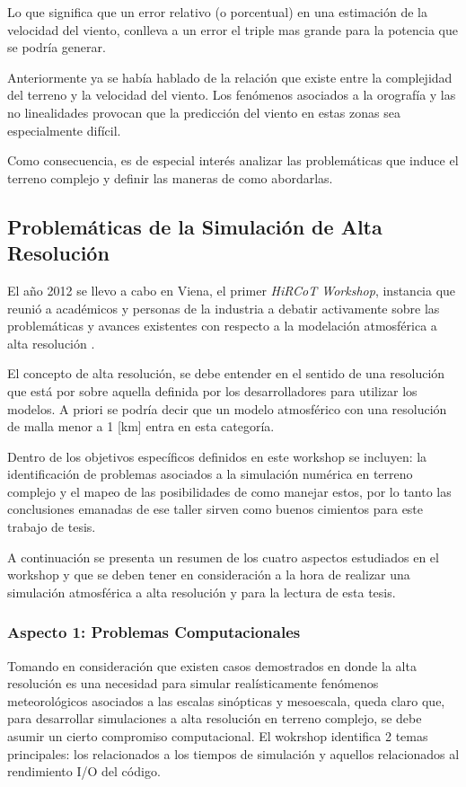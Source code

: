 Lo que significa que un error relativo (o porcentual) en una estimación de la velocidad del viento, conlleva a un error el triple mas grande para la potencia que se podría generar.

Anteriormente ya se había hablado de la relación que existe entre la complejidad del terreno y la velocidad del viento. Los fenómenos asociados a la orografía y las no linealidades provocan que la predicción del viento en estas zonas sea especialmente difícil. 

Como consecuencia, es de especial interés analizar las problemáticas que induce el terreno complejo y definir las maneras de como abordarlas.
\subsection{Problemáticas de la Simulación de Alta Resolución}
El año 2012 se llevo a cabo en Viena, el primer \emph{HiRCoT Workshop}, instancia que reunió a académicos y personas de la industria a debatir activamente sobre las problemáticas y avances existentes con respecto a la modelación atmosférica a alta resolución \cite{Arnold2010}.

El concepto de alta resolución, se debe entender en el sentido de una resolución que está por sobre aquella definida por los desarrolladores para utilizar los modelos. A priori se podría decir que un modelo atmosférico con una resolución de malla menor a 1 [km] entra en esta categoría.

Dentro de los objetivos específicos definidos en este workshop se incluyen: la identificación de problemas asociados a la simulación numérica en terreno complejo y el mapeo de las posibilidades de como manejar estos, por lo tanto las conclusiones emanadas de ese taller sirven como buenos cimientos para este trabajo de tesis.

A continuación se presenta un resumen de los cuatro aspectos estudiados en el workshop y que se deben tener en consideración a la hora de realizar una simulación atmosférica a alta resolución y para la lectura de esta tesis.

\subsubsection{Aspecto 1: Problemas Computacionales}
Tomando en consideración que existen casos demostrados en donde la alta resolución es una necesidad para simular realísticamente fenómenos meteorológicos asociados a las escalas sinópticas y mesoescala, queda claro que, para desarrollar simulaciones a alta resolución en terreno complejo, se debe asumir un cierto compromiso computacional. El wokrshop identifica 2 temas principales: los relacionados a los tiempos de simulación y aquellos relacionados al rendimiento I/O del código.

